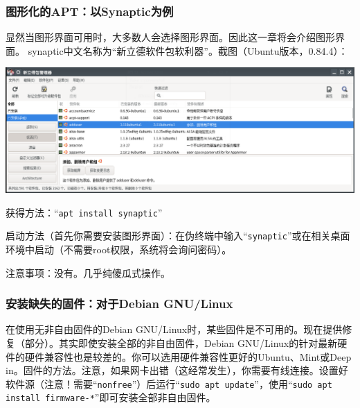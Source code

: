 \subsubsection{图形化的APT：以Synaptic为例}
显然当图形界面可用时，大多数人会选择图形界面。因此这一章将会介绍图形界面。
synaptic中文名称为“新立德软件包软利器”。截图（Ubuntu版本，0.84.4）：
\begin{center}
	\includegraphics[scale=0.5]{pic/synaptic.png} 	
\end{center} \par
获得方法：“\verb|apt install synaptic|” \par
启动方法（首先你需要安装图形界面）：在伪终端中输入“\verb|synaptic|”或在相关桌面环境中启动（不需要root权限，系统将会询问密码）。\par
注意事项：没有。几乎纯傻瓜式操作。
\subsubsection{安装缺失的固件：对于Debian GNU/Linux}
在使用无非自由固件的Debian GNU/Linux时，某些固件是不可用的。现在提供修复（部分）。其实即使安装全部的非自由固件，Debian GNU/Linux的针对最新硬件的硬件兼容性也是较差的。你可以选用硬件兼容性更好的Ubuntu、Mint或Deep in。固件的方法。注意，如果网卡出错（这经常发生），你需要有线连接。设置好软件源（注意！需要“\verb|nonfree|”）后运行“\verb|sudo apt update|”，使用“\verb|sudo apt install firmware-*|”即可安装全部非自由固件。
